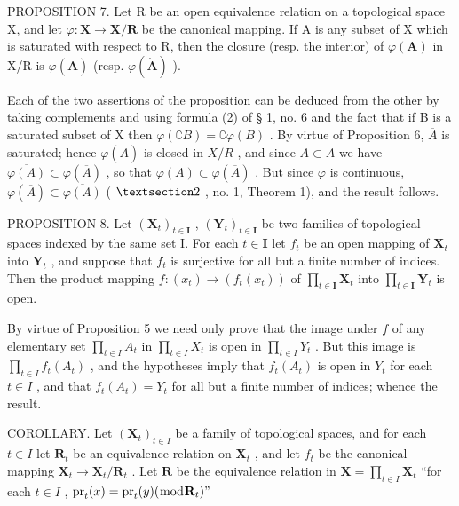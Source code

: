 PROPOSITION 7. Let R be an open equivalence relation on a topological space X, and let \(\varphi: \mathbf{X} \to \mathbf{X}/\mathbf{R}\) be the canonical mapping. If A is any subset of X which is saturated with respect to R, then the closure (resp. the interior) of \(\varphi(\mathbf{A})\) in X/R is \(\varphi(\overline{\mathbf{A}})\) (resp. \(\varphi(\mathring{\mathbf{A}})\) ).

Each of the two assertions of the proposition can be deduced from the other by taking complements and using formula (2) of § 1, no. 6 and the fact that if B is a saturated subset of X then \(\varphi(\complement B) = \complement \varphi(B)\) . By virtue of Proposition 6, \(\overline{A}\) is saturated; hence \(\varphi(\overline{A})\) is closed in \(X/R\) , and since \(A \subset \overline{A}\) we have \(\overline{\varphi(A)} \subset \varphi(\overline{A})\) , so that \(\varphi(A) \subset \varphi(\overline{A})\) . But since \(\varphi\) is continuous, \(\varphi(\overline{A}) \subset \overline{\varphi(A)}\) ( \(\S 2\) , no. 1, Theorem 1), and the result follows.

PROPOSITION 8. Let \((\mathbf{X}_t)_{t \in \mathbf{I}}\) , \((\mathbf{Y}_t)_{t \in \mathbf{I}}\) be two families of topological spaces indexed by the same set I. For each \(t \in \mathbf{I}\) let \(f_t\) be an open mapping of \(\mathbf{X}_t\) into \(\mathbf{Y}_t\) , and suppose that \(f_t\) is surjective for all but a finite number of indices. Then the product mapping \(f: (x_t) \to (f_t(x_t))\) of \(\prod_{t \in \mathbf{I}} \mathbf{X}_t\) into \(\prod_{t \in \mathbf{I}} \mathbf{Y}_t\) is open.

By virtue of Proposition 5 we need only prove that the image under \(f\) of any elementary set \(\prod_{t \in I} A_t\) in \(\prod_{t \in I} X_t\) is open in \(\prod_{t \in I} Y_t\) . But this image is \(\prod_{t \in I} f_t(A_t)\) , and the hypotheses imply that \(f_t(A_t)\) is open in \(Y_t\) for each \(t \in I\) , and that \(f_t(A_t) = Y_t\) for all but a finite number of indices; whence the result.

COROLLARY. Let \((\mathbf{X}_t)_{t \in I}\) be a family of topological spaces, and for each \(t \in I\) let \(\mathbf{R}_t\) be an equivalence relation on \(\mathbf{X}_t\) , and let \(f_t\) be the canonical mapping \(\mathbf{X}_t \to \mathbf{X}_t / \mathbf{R}_t\) . Let \(\mathbf{R}\) be the equivalence relation in \(\mathbf{X} = \prod_{t \in I} \mathbf{X}_t\) ``for each \(t \in I\) , \(\operatorname{pr}_t(x) = \operatorname{pr}_t(y) (\bmod \mathbf{R}_t)"\)

